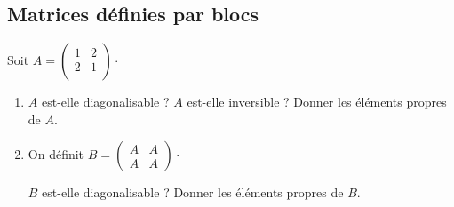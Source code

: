 \documentclass[a4paper,twoside,french,10pt]{VcCours}
\begin{document}
\subsection{Matrices définies par blocs}


\begin{Exercice}{} Soit $A= \begin{pmatrix}
1& 2 \\
2 & 1 \\
\end{pmatrix}\cdot$
\begin{enumerate}
\item $A$ est-elle diagonalisable ? $A$ est-elle inversible ? Donner les éléments propres de $A$.
\item  On définit $B = \begin{pmatrix}
A & A \\
A & A 
\end{pmatrix}\cdot$

$B$ est-elle diagonalisable ? Donner les éléments propres de $B$.
\end{enumerate}
\end{Exercice}
\end{document}
